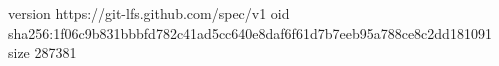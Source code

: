 version https://git-lfs.github.com/spec/v1
oid sha256:1f06c9b831bbbfd782c41ad5cc640e8daf6f61d7b7eeb95a788ce8c2dd181091
size 287381
